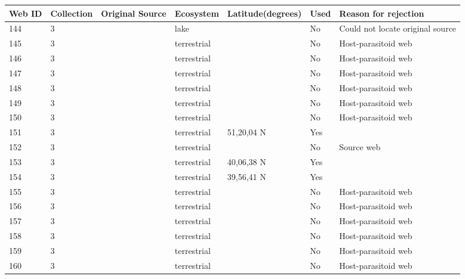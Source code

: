 \documentclass[12pt]{article}
\begin{document}
\begin{landscape}
    \begin{table}[h!]
    \centering
    {\footnotesize
      \begin{tabular}{p{2.8cm}p{1.3cm}p{5.5cm}p{2.2cm}p{2.5cm}lp{3.5cm}}
        \hline
        Web ID & Collection & Original Source & Ecosystem & Latitude(degrees) & Used  & Reason for rejection  \\
        \hline
        144   & 3 & \cite{Snow1958}  & lake  &       & No    & Could not locate original source \\
        145   & 3 & \cite{Rejmanek1979}  & terrestrial &       & No    & Host-parasitoid web \\
        146   & 3 & \cite{Rejmanek1979}  & terrestrial &       & No    & Host-parasitoid web \\
        147   & 3 & \cite{Rejmanek1979}  & terrestrial &       & No    & Host-parasitoid web \\
        148   & 3 & \cite{Rejmanek1979}  & terrestrial &       & No    & Host-parasitoid web \\
        149   & 3 & \cite{Force1974}    & terrestrial &       & No    & Host-parasitoid web \\
        150   & 3 & \cite{Hopkins1984}     & terrestrial &       & No    & Host-parasitoid web \\
        151   & 3 & \cite{Richards1926}     & terrestrial & 51,20,04 N & Yes   &       \\
        152   & 3 & \cite{Whittaker1984}    & terrestrial &       & No    & Source web \\
        153   & 3 & \cite{Mayse1978}    & terrestrial & 40,06,38 N & Yes   &       \\
        154   & 3 & \cite{Mayse1978}    & terrestrial & 39,56,41 N & Yes   &       \\
        155   & 3 & \cite{Askew1975}     & terrestrial &       & No    & Host-parasitoid web \\
        156   & 3 & \cite{Askew1961}     & terrestrial &       & No    & Host-parasitoid web \\
        157   & 3 & \cite{Askew1961}     & terrestrial &       & No    & Host-parasitoid web \\
        158   & 3 & \cite{Askew1961}     & terrestrial &       & No    & Host-parasitoid web \\
        159   & 3 & \cite{Askew1961}     & terrestrial &       & No    & Host-parasitoid web \\
        160   & 3 & \cite{Askew1961}     & terrestrial &       & No    & Host-parasitoid web \\

\end{tabular}}
\end{table}
\end{landscape}
\end{document}

